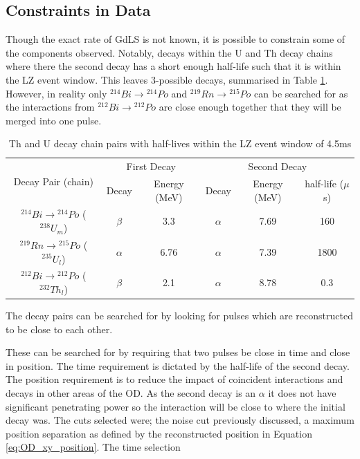 \subsection{Constraints in Data}
\par
Though the exact rate of GdLS is not known, it is possible to constrain some of the components observed.
Notably, decays within the U and Th decay chains where there the second decay has a short enough half-life such that it is within the LZ event window.
This leaves 3-possible decays, summarised in Table \ref{tab:od_constrainable_decays_in_data}.
However, in reality only  ${}^{214}Bi \to {}^{214}Po$ and ${}^{219}Rn \to {}^{215}Po$ can be searched for as the interactions from ${}^{212}Bi \to {}^{212}Po$ are close enough together that they will be merged into one pulse.

\begin{table}[!htbp]
    \centering
    \begin{tabular}{c|c|c|c|c|c}
        \multirow{2}{*}{Decay Pair (chain)}                    & \multicolumn{2}{c|}{First Decay}   & \multicolumn{3}{c}{Second Decay}    \\ 
                                                               & Decay    & Energy (MeV) & Decay    & Energy (MeV) & half-life ($\mu$s) \\ \hline
        ${}^{214}Bi \to {}^{214}Po$ (${}^{238}U_{m}$)          & $\beta$  & 3.3          & $\alpha$ & 7.69         & 160   \\ 
        ${}^{219}Rn \to {}^{215}Po$ (${}^{235}U_{l}$)          & $\alpha$ & 6.76         & $\alpha$ & 7.39         & 1800  \\ 
        ${}^{212}Bi \to {}^{212}Po$ (${}^{232}Th_{l}$)         & $\beta$  & 2.1          & $\alpha$ & 8.78         & 0.3
    \end{tabular}
    \caption{Th and U decay chain pairs with half-lives within the LZ event window of 4.5ms}
    \label{tab:od_constrainable_decays_in_data}
\end{table}

\par
The decay pairs can be searched for by looking for pulses which are reconstructed to be close to each other.

These can be searched for by requiring that two pulses be close in time and close in position. 
The time requirement is dictated by the half-life of the second decay.
The position requirement is to reduce the impact of coincident interactions and decays in other areas of the OD.
As the second decay is an $\alpha$ it does not have significant penetrating power so the interaction will be close to where the initial decay was.
The cuts selected were; the noise cut previously discussed, a maximum position separation as defined by the reconstructed position in Equation \ref{eq:OD_xy_position}.
The time selection

